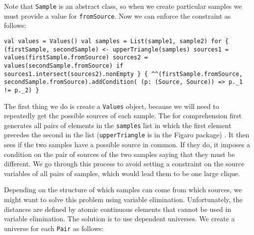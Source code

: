 Note that \texttt{Sample} is an abstract class, so when we create particular samples we must provide a value for \texttt{fromSource}. Now we can enforce the constraint as follows:

\begin{flushleft}
\texttt{val values = Values()
\newline val samples = List(sample1, sample2)
\newline for \{
\newline \tab (firstSample, secondSample) <- upperTriangle(samples)
\newline \tab sources1 = values(firstSample.fromSource) 
\newline \tab sources2 = values(secondSample.fromSource) 
\newline if sources1.intersect(sources2).nonEmpty
\newline \} \{
\newline \tab \textasciicircum\textasciicircum(firstSample.fromSource, secondSample.fromSource).addCondition( (p: (Source, Source)) => p.\_1 != p.\_2)
\newline \}
}
\end{flushleft}

The first thing we do is create a \texttt{Values} object, because we will need to repeatedly get the possible sources of each sample. The for comprehension first generates all pairs of elements in the \texttt{samples} list in which the first element precedes the second in the list (\texttt{upperTriangle} is in the Figaro package) . It then sees if the two samples have a possible source in common. If they do, it imposes a condition on the pair of sources of the two samples saying that they must be different. We go through this process to avoid setting a constraint on the source variables of all pairs of samples, which would lead them to be one large clique.

Depending on the structure of which samples can come from which sources, we might want to solve this problem using variable elimination. Unfortunately, the distances are defined by atomic continuous elements that cannot be used in variable elimination. The solution is to use dependent universes. We create a universe for each \texttt{Pair} as follows:

